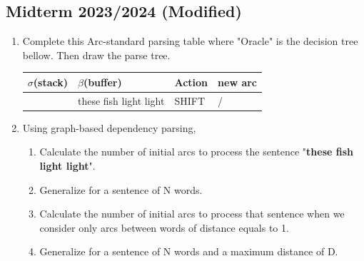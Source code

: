 \documentclass{../extra/aakpract/aakpract}
\begin{document}
	\subsection{Midterm 2023/2024 (Modified)}
	
	\begin{enumerate}
		\item Complete this Arc-standard parsing table where "Oracle" is the decision tree bellow. Then draw the parse tree.
		\begin{center}
			\begin{tabular}{|l|l|l|l|}
			\hline
			$\sigma$(stack) &
			$\beta$(buffer) &
			Action &
			new arc \\
			\hline
			[ROOT] &
			these fish light light &
			SHIFT &
			/ \\
			\hline
			\end{tabular}
		\end{center}
		\item Using graph-based dependency parsing, 
		\begin{enumerate}
			\item Calculate the number of initial arcs to process the sentence "\textbf{these fish light light}".
			\item Generalize for a sentence of N words.
			\item Calculate the number of initial arcs to process that sentence when we consider only arcs between words of distance equals to 1.
			\item Generalize for a sentence of N words and a maximum distance of D.
		\end{enumerate}
		
	\end{enumerate}
	
\end{document}
